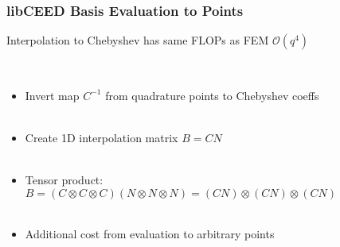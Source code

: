 \documentclass{beamer}
\begin{document}

\begin{frame}
\begin{center}
\frametitle{libCEED Basis Evaluation to Points}

Interpolation to Chebyshev has same FLOPs as FEM $\mathcal{O} \left( q^4 \right)$

~\\

\begin{itemize}

\item Invert map $C^{-1}$ from quadrature points to Chebyshev coeffs\\

~\\

\item Create 1D interpolation matrix $B = C N$\\

~\\

\item Tensor product: $B = \left( C \otimes C \otimes C \right) \left( N \otimes N \otimes N \right) = \left( C N \right) \otimes \left( C N \right) \otimes \left( C N \right)$\\

~\\

\item Additional cost from evaluation to arbitrary points\\

\end{itemize}

\end{center}
\end{frame}

\end{document}

